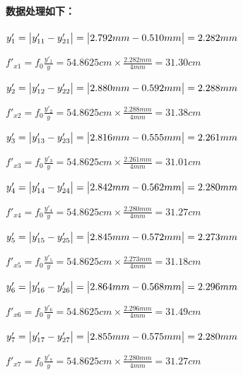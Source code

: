 \documentclass[UTF8]{ctexart}
\begin{document}
\paragraph{数据处理如下：}\quad\par
\quad{}$y'_1=\big{|}y'_{11}-y'_{21}\big{|}=\big{|}2.792mm-0.510mm\big{|}=2.282mm$\par\quad\quad\quad\quad\quad{}$\displaystyle{f'_{x1}=f_0\frac{y'_1}{y}=54.8625cm\times \frac{2.282mm}{4mm}=31.30cm}$\par\vspace{1em}
\quad{}$y'_2=\big{|}y'_{12}-y'_{22}\big{|}=\big{|}2.880mm-0.592mm\big{|}=2.288mm$\par\quad\quad\quad\quad\quad{}$\displaystyle{f'_{x2}=f_0\frac{y'_2}{y}=54.8625cm\times \frac{2.288mm}{4mm}=31.38cm}$\par\vspace{1em}
\quad{}$y'_3=\big{|}y'_{13}-y'_{23}\big{|}=\big{|}2.816mm-0.555mm\big{|}=2.261mm$\par\quad\quad\quad\quad\quad{}$\displaystyle{f'_{x3}=f_0\frac{y'_3}{y}=54.8625cm\times \frac{2.261mm}{4mm}=31.01cm}$\par\vspace{1em}
\quad{}$y'_4=\big{|}y'_{14}-y'_{24}\big{|}=\big{|}2.842mm-0.562mm\big{|}=2.280mm$\par\quad\quad\quad\quad\quad{}$\displaystyle{f'_{x4}=f_0\frac{y'_4}{y}=54.8625cm\times \frac{2.280mm}{4mm}=31.27cm}$\par\vspace{1em}
\quad{}$y'_5=\big{|}y'_{15}-y'_{25}\big{|}=\big{|}2.845mm-0.572mm\big{|}=2.273mm$\par\quad\quad\quad\quad\quad{}$\displaystyle{f'_{x5}=f_0\frac{y'_5}{y}=54.8625cm\times \frac{2.273mm}{4mm}=31.18cm}$\par\vspace{1em}
\quad{}$y'_6=\big{|}y'_{16}-y'_{26}\big{|}=\big{|}2.864mm-0.568mm\big{|}=2.296mm$\par\quad\quad\quad\quad\quad{}$\displaystyle{f'_{x6}=f_0\frac{y'_6}{y}=54.8625cm\times \frac{2.296mm}{4mm}=31.49cm}$\par\vspace{1em}
\quad{}$y'_7=\big{|}y'_{17}-y'_{27}\big{|}=\big{|}2.855mm-0.575mm\big{|}=2.280mm$\par\quad\quad\quad\quad\quad{}$\displaystyle{f'_{x7}=f_0\frac{y'_7}{y}=54.8625cm\times \frac{2.280mm}{4mm}=31.27cm}$\par\vspace{1em}
\end{document}
